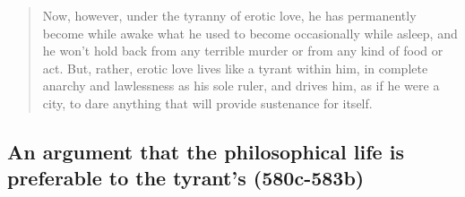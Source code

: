 \documentclass[oneside]{article}
\begin{document}
\begin{quote}
Now, however, under the tyranny of erotic love, he has permanently
become while awake what he used to become occasionally while asleep, and he won't hold back from any terrible murder or from any kind of food or
act. But, rather, erotic love lives like a tyrant within him, in
complete anarchy and lawlessness as his sole ruler, and drives him, as
if he were a city, to dare anything that will provide sustenance for
itself.
\end{quote}








\subsection*{An argument that the philosophical life is preferable to the tyrant's (580c-583b)}\label{second-argument-580c-583b}
\end{document}
